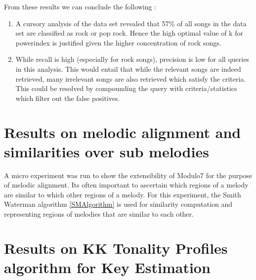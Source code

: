 From these results we can conclude the following : 

\begin{enumerate}
\item A cursory analysis of the data set revealed that 57\% of all songs in the data set are classified as rock or pop rock. Hence the high optimal value of k for powerindex is justified given the higher concentration of rock songs. 
\item While recall is high (especially for rock songs), precision is low for all queries in this analysis. This would entail that while the relevant songs are indeed retrieved, many irrelevant songs are also retrieved which satisfy the criteria. This could be resolved by compounding the query with criteria/statistics which filter out the false positives. 
\end{enumerate}

\section{Results on melodic alignment and similarities over sub melodies}

\noindent A micro experiment was run to show the extensibility of Modulo7 for the purpose of melodic alignment. Its often important to ascertain which regions of a melody are similar to which other regions of a melody. For this experiment, the Smith Waterman algorithm \ref{SMAlgorithm} is used for similarity computation and representing regions of melodies that are similar to each other. 

\section{Results on KK Tonality Profiles algorithm for Key Estimation}

